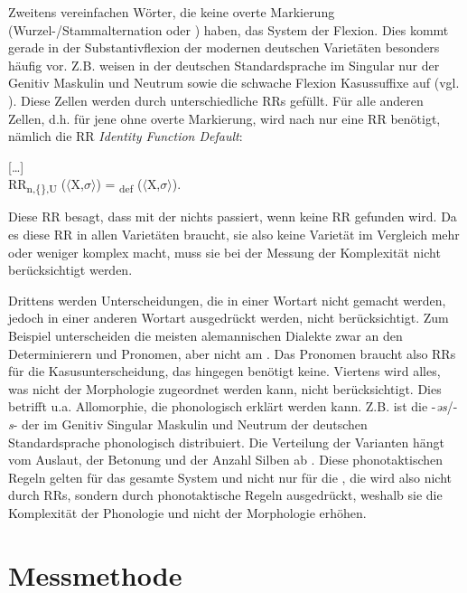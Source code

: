 \begin{exe}
\begin{exe}
Zweitens vereinfachen Wörter, die keine overte Markierung (Wur\-zel-/Stamm\-al\-ter\-na\-tion oder ) haben, das System der Flexion. Dies kommt gerade in der Substantivflexion der modernen deutschen Varietäten besonders häufig vor. Z.B. weisen in der deutschen Standardsprache im Singular nur der Genitiv Maskulin und Neutrum sowie die schwache Flexion Kasussuffixe auf (vgl. ). Diese Zellen werden durch unterschiedliche RRs gefüllt. Für alle anderen Zellen, d.h. für jene ohne overte Markierung, wird nach \citet{Stump2001} nur eine RR benötigt, nämlich die RR \textit{Identity Function Default}:

\begin{exe}%
 […]\\
RR\textsubscript{n,\{\},U} ($\langle$X,$\sigma$$\rangle$) = \textsubscript{def} ($\langle$X,$\sigma$$\rangle$). \citep[53]{Stump2001}
\end{exe}

\noindent
Diese RR besagt, dass mit der  nichts passiert, wenn keine RR gefunden wird. Da es diese RR in allen Varietäten braucht, sie also keine Varietät im Vergleich mehr oder weniger komplex macht, muss sie bei der Messung der Komplexität nicht berücksichtigt werden.

Drittens werden Unterscheidungen, die in einer Wortart nicht gemacht werden, jedoch in einer anderen Wortart ausgedrückt werden, nicht berücksichtigt. Zum Beispiel unterscheiden die meisten alemannischen Dialekte zwar  an den Determinierern und Pronomen, aber nicht am . Das Pronomen braucht also RRs für die Kasusunterscheidung, das  hingegen benötigt keine. Viertens wird alles, was nicht der Morphologie zugeordnet werden kann, nicht berücksichtigt. Dies betrifft u.a. Allomorphie, die phonologisch erklärt werden kann. Z.B. ist die -\textit{əs}/-\textit{s}- der  im Genitiv Singular Maskulin und Neutrum der deutschen Standardsprache phonologisch distribuiert. Die Verteilung der Varianten hängt vom Auslaut, der Betonung und der Anzahl Silben ab \citep[224-225]{EisenbergGelhausHenneSittaWellmann1998}. Diese phonotaktischen Regeln gelten für das gesamte System und nicht nur für die , die  wird also nicht durch RRs, sondern durch phonotaktische Regeln ausgedrückt, weshalb sie die Komplexität der Phonologie und nicht der Morphologie erhöhen.

\section{Messmethode}\label{4.3}


\end{exe}
\end{exe}
